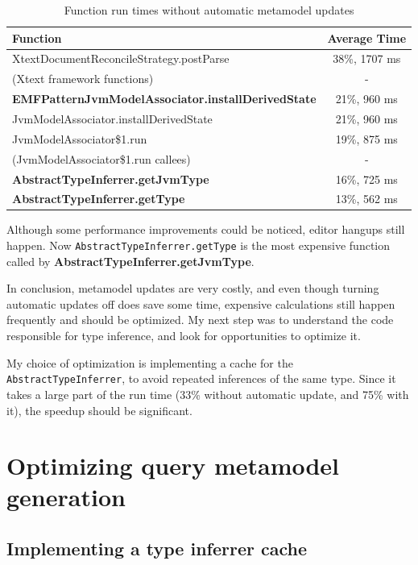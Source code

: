 \documentclass[11pt,a4paper,oneside]{report}
\begin{document}
\begin{table}[ht]
    \footnotesize
    \centering
    \begin{tabular}{ l c }
        \toprule
        Function & Average Time \\
        \midrule
        XtextDocumentReconcileStrategy.postParse & 38\%, 1707 ms \\
        (Xtext framework functions) & - \\
        \textbf{EMFPatternJvmModelAssociator.installDerivedState} & 21\%, 960 ms \\
        JvmModelAssociator.installDerivedState & 21\%, 960 ms \\
        JvmModelAssociator\$1.run & 19\%, 875 ms \\
        (JvmModelAssociator\$1.run callees) & - \\
        \textbf{AbstractTypeInferrer.getJvmType} & 16\%, 725 ms \\
        \textbf{AbstractTypeInferrer.getType} & 13\%, 562 ms \\
        \bottomrule
    \end{tabular}
    \caption{Function run times without automatic metamodel updates}
    \label{tab:postparse-no-auto-update}
\end{table}

Although some performance improvements could be noticed, editor hangups still
happen. Now \texttt{AbstractTypeInferrer.getType} is the most expensive function
called by \textbf{AbstractTypeInferrer.getJvmType}.

In conclusion, metamodel updates are very costly, and even though turning
automatic updates off does save some time, expensive calculations still happen
frequently and should be optimized. My next step was to understand the code
responsible for type inference, and look for opportunities to optimize it.

My choice of optimization is implementing a cache for the
\texttt{AbstractTypeInferrer}, to avoid repeated inferences of the same type.
Since it takes a large part of the run time (33\% without automatic update,
and 75\% with it), the speedup should be significant.

\chapter{Optimizing query metamodel generation}
\section{Implementing a type inferrer cache}
\end{document}
